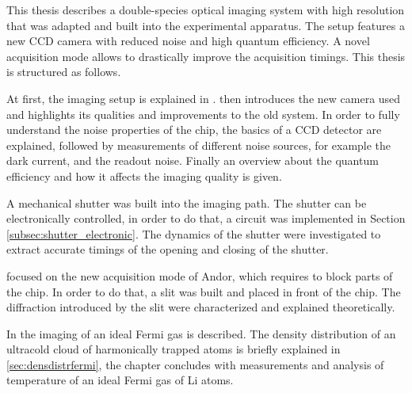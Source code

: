 This thesis describes a double-species optical imaging system with high resolution that was adapted and built into the experimental apparatus. The setup features a new CCD camera with reduced noise and high quantum efficiency. A novel acquisition mode allows to drastically improve the acquisition timings. This thesis is structured as follows.

At first, the imaging setup is explained in .  then introduces the new camera used and highlights its qualities and improvements to the old system. In order to fully understand the noise properties of the chip, the basics of a CCD detector are explained, followed by measurements of different noise sources, for example the dark current, and the readout noise.
Finally an overview about the quantum efficiency and how it affects the imaging quality is given.

A mechanical shutter was built into the imaging path. The shutter can be electronically controlled, in order to do that, a circuit was implemented in Section \ref{subsec:shutter_electronic}. The dynamics of the shutter were investigated to extract accurate timings of the opening and closing of the shutter.

 focused on the new acquisition mode of Andor, which requires to block parts of the chip. In order to do that, a slit was built and placed in front of the chip. The diffraction introduced by the slit were characterized and explained theoretically.

In  the imaging of an ideal Fermi gas is described. The density distribution of an ultracold cloud of harmonically trapped atoms is briefly explained in \ref{sec:densdistrfermi}, the chapter concludes with measurements and analysis of temperature of an ideal Fermi gas of Li atoms.